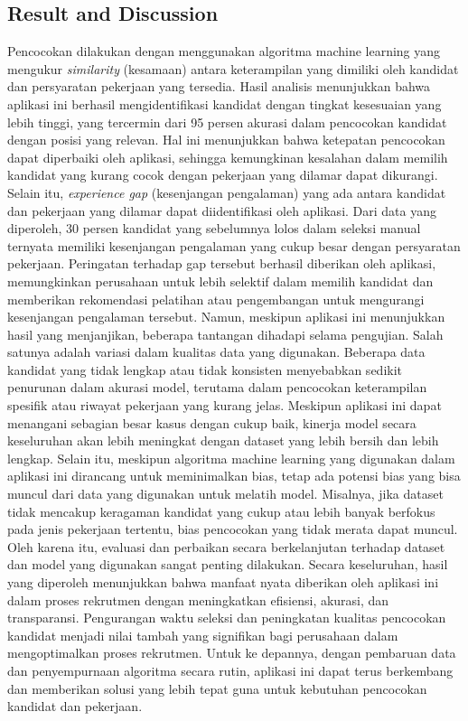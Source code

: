 \documentclass[journal,article,submit,pdftex,moreauthors]{Definitions/mdpi}
\begin{document}
\subsection{Result and Discussion}
Pencocokan dilakukan dengan menggunakan algoritma machine learning yang mengukur \textit{similarity} (kesamaan) antara keterampilan yang dimiliki oleh kandidat dan persyaratan pekerjaan yang tersedia. Hasil analisis menunjukkan bahwa aplikasi ini berhasil mengidentifikasi kandidat dengan tingkat kesesuaian yang lebih tinggi, yang tercermin dari 95 persen akurasi dalam pencocokan kandidat dengan posisi yang relevan. Hal ini menunjukkan bahwa ketepatan pencocokan dapat diperbaiki oleh aplikasi, sehingga kemungkinan kesalahan dalam memilih kandidat yang kurang cocok dengan pekerjaan yang dilamar dapat dikurangi. Selain itu, \textit{experience gap} (kesenjangan pengalaman) yang ada antara kandidat dan pekerjaan yang dilamar dapat diidentifikasi oleh aplikasi. Dari data yang diperoleh, 30 persen kandidat yang sebelumnya lolos dalam seleksi manual ternyata memiliki kesenjangan pengalaman yang cukup besar dengan persyaratan pekerjaan. Peringatan terhadap gap tersebut berhasil diberikan oleh aplikasi, memungkinkan perusahaan untuk lebih selektif dalam memilih kandidat dan memberikan rekomendasi pelatihan atau pengembangan untuk mengurangi kesenjangan pengalaman tersebut. Namun, meskipun aplikasi ini menunjukkan hasil yang menjanjikan, beberapa tantangan dihadapi selama pengujian. Salah satunya adalah variasi dalam kualitas data yang digunakan. Beberapa data kandidat yang tidak lengkap atau tidak konsisten menyebabkan sedikit penurunan dalam akurasi model, terutama dalam pencocokan keterampilan spesifik atau riwayat pekerjaan yang kurang jelas. Meskipun aplikasi ini dapat menangani sebagian besar kasus dengan cukup baik, kinerja model secara keseluruhan akan lebih meningkat dengan dataset yang lebih bersih dan lebih lengkap. Selain itu, meskipun algoritma machine learning yang digunakan dalam aplikasi ini dirancang untuk meminimalkan bias, tetap ada potensi bias yang bisa muncul dari data yang digunakan untuk melatih model. Misalnya, jika dataset tidak mencakup keragaman kandidat yang cukup atau lebih banyak berfokus pada jenis pekerjaan tertentu, bias pencocokan yang tidak merata dapat muncul. Oleh karena itu, evaluasi dan perbaikan secara berkelanjutan terhadap dataset dan model yang digunakan sangat penting dilakukan. Secara keseluruhan, hasil yang diperoleh menunjukkan bahwa manfaat nyata diberikan oleh aplikasi ini dalam proses rekrutmen dengan meningkatkan efisiensi, akurasi, dan transparansi. Pengurangan waktu seleksi dan peningkatan kualitas pencocokan kandidat menjadi nilai tambah yang signifikan bagi perusahaan dalam mengoptimalkan proses rekrutmen. Untuk ke depannya, dengan pembaruan data dan penyempurnaan algoritma secara rutin, aplikasi ini dapat terus berkembang dan memberikan solusi yang lebih tepat guna untuk kebutuhan pencocokan kandidat dan pekerjaan.
\end{document}
